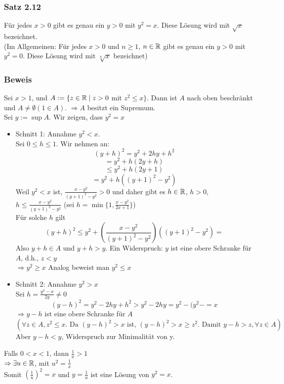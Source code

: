 \subsubsection*{Satz 2.12}
Für jedes $x>0$ gibt es genau ein $y>0$ mit $y^2=x$. Diese Lösung wird mit $\sqrt{x}$ bezeichnet.\\

(Im Allgemeinen: Für jedes $x>0$ und $n\geq 1$, $n\in\mathbb{R}$ gibt es genau ein $y>0$ mit $y^2=0$. Diese Lösung wird mit $\sqrt[n]{x}$ bezeichnet)
\subsubsection*{Beweis}
Sei $x>1$, und $A:=\{ z\in\mathbb{R}\mid z>0$ mit $z^2\leq x\}$. Dann ist $A$ nach oben beschränkt und $A\not=\emptyset (1\in A)$. $\Rightarrow A$ besitzt ein Supremum. \\
Sei $y:=\sup A$. Wir zeigen, dass $y^2=x$
\begin{itemize}
    \item Schnitt 1: Annahme $y^2<x$. \\
    Sei $0\leq h\leq 1$.  Wir nehmen an: \[\left( y+h\right)^2=y^2+2hy+h^2\]
    \[=y^2+h(2y+h)\]
    \[\leq y^2+h(2y+1)\]
    \[=y^2 +h\left( (y+1)^2 -y^2\right)\]
    Weil $y^2<x$ ist, $\frac{x-y^2}{(y+1)^2-y^2}>0$ und daher gibt es $h\in\mathbb{R}$, $h>0$, $h\leq\frac{x-y^2}{(y+1)^2-y^2}$ (sei $h=\min \{1,\frac{x-y^2}{2x+1}\}$)\\

    Für solche $h$ gilt \[(y+h)^2\leq y^2 + \left( \frac{x-y^2}{(y+1)^2-y^2}\right)\left( (y+1)^2 -y^2\right)=\] Also $y+h\in A$ und $y+h>y$. Ein Widerspruch: $y$ ist eine obere Schranke für $A$, d.h., $z<y$\\$\Rightarrow y^2\geq x$ Analog beweist man $y^2\leq x$
    \item Schnitt 2: Annahme $y^2>x$\\
    Sei $h=\frac{y^2-x}{2y}\not=0$
    \[(y-h)^2=y^2-2hy+h^2>y^2-2hy=y^2 -(y^2-=x\]
    $\Rightarrow y-h$ ist eine obere Schranke für $A$
    \[\left( \forall z \in A, z^2\leq x\text{. Da }(y-h)^2>x \text{ ist, } (y-h)^2>x\geq z^2\text{. Damit } y-h>z, \forall z \in A\right)\]
    Aber $y-h<y$, Widerspruch zur Minimalität von y.
\end{itemize}
Falls $0<x<1$, dann $\frac{1}{x}>1$\\
$\Rightarrow \exists u\in\mathbb{R}$, mit $u^2=\frac{1}{x}$\\
Somit $\left( \frac{1}{u}\right)^2=x$ und $y=\frac{1}{u}$ ist eine Lösung von $y^2=x$.\\

